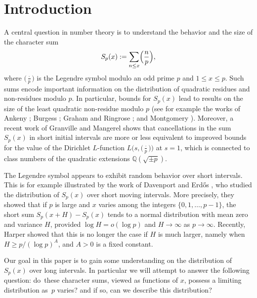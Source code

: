 \documentclass[JEP,XML,SOM,Unicode,NoFloatCountersInSection,published]{cedram}
\theoremstyle{plain}
\theoremstyle{definition}
\newcommand{\Legendre}[2]{\Bigl(\dfrac{#1}{#2}\Bigr)}
\begin{document}
\maketitle
\vspace*{-1.2\baselineskip}
\tableofcontents
\mainmatter

\vspace*{-2.2\baselineskip}\vskip0pt
\section{Introduction}\label{s: introduction_real_characters}

A central question in number theory is to understand the behavior and the size of the character sum\vspace*{-3pt}
\begin{equation}\label{eq: definition of character sum}
S_p(x) := \sum_{n \leq x} \Legendre{n}{p},
\end{equation}
where $\bigl(\frac{\cdot}{p}\bigr)$ is the Legendre symbol modulo an odd prime $p$ and $1\leq x\leq p$.
Such sums encode important
information on the distribution of quadratic residues and non-residues modulo $p$. In particular, bounds for $S_p(x)$ lead to results on the size of the least quadratic non-residue
modulo $p$ (see for example the works of Ankeny \cite{An};
Burgess \cite{Bu}; Graham and Ringrose \cite{GrRi}; and Montgomery
\cite{Mo}). Moreover, a recent work of Granville and Mangerel \cite{GrMa} shows that cancellations in the sum $S_p(x)$ in short initial intervals are more or less equivalent to improved bounds for the value of the Dirichlet $L$-function $L\big(s, \big(\frac{\cdot}{p}\big)\big)$ at $s=1$, which is connected to class numbers of the quadratic extensions $\mathbb{Q}(\sqrt{\pm p})$.

The Legendre symbol appears to exhibit random behavior over short intervals. This is for example illustrated by the work of Davenport and Erd\H{o}s \cite{DaEr}, who studied the distribution of $S_p(x)$ over short moving intervals. More precisely, they showed that if $p$ is large and $x$ varies among the integers $\{0, 1, \dots, p-1\}$, the short sum $S_p(x+H)-S_p(x)$ tends to a normal distribution with mean zero and variance $H$, provided $\log H = o(\log p)$ and $H \rightarrow \infty$ as $p \rightarrow \infty$. Recently, Harper \cite{Ha3} showed that this is no longer the case if $H$ is much larger, namely when $H\geq p/(\log p)^A$, and $A>0$ is a fixed constant.

Our goal in this paper is to gain some understanding on the distribution of $S_p(x)$ over long intervals. In particular we will attempt to answer the following question: do~these character sums, viewed as functions of $x$, possess a limiting distribution as~$p$ varies? and if so, can we describe this distribution?
\end{document}
